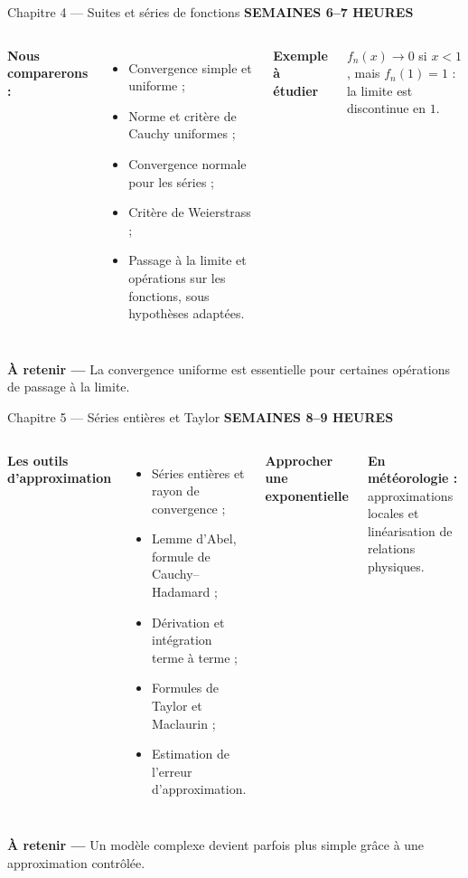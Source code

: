 \documentclass[aspectratio=169,10pt]{beamer}
\newcommand{\meta}[1]{{\small\bfseries\color{turquoise} #1}\par\vspace{0.07cm}}
\newcommand{\formule}[2]{\begin{tcolorbox}[colback=pale,colframe=pale]
  {\small\bfseries\color{bleu}#1}\par\vspace{0.13cm}
  \centering {\large\color{nuit}$\displaystyle #2$}\par
\end{tcolorbox}}
\newcommand{\takeaway}[1]{\vfill\begin{tcolorbox}[colback=palevert,colframe=palevert]
{\small\color{encre}\textbf{À retenir —} #1}\end{tcolorbox}}
\newcommand{\smalllist}{\setlength{\itemsep}{0.04cm}\setlength{\parskip}{0pt}}
\begin{document}
\begin{frame}{Chapitre 4 — Suites et séries de fonctions}
\meta{SEMAINES 6–7 \quad\textbullet{} HEURES}
\begin{columns}[T,onlytextwidth]
{\bfseries\color{nuit}Nous comparerons :}
\begin{itemize}\smalllist
\item Convergence simple et uniforme ;
\item Norme et critère de Cauchy uniformes ;
\item Convergence normale pour les séries ;
\item Critère de Weierstrass ;
\item Passage à la limite et opérations sur les fonctions, sous hypothèses adaptées.
\end{itemize}
\formule{Exemple à étudier}{f_n(x)=x^n,\quad x\in[0,1]}
\begin{tcolorbox}[colback=paleorange,colframe=paleorange]
\small $f_n(x)\to 0$ si $x<1$, mais $f_n(1)=1$ : la limite est discontinue en $1$.
\end{tcolorbox}
\end{columns}
\takeaway{La convergence uniforme est essentielle pour certaines opérations de passage à la limite.}
\end{frame}

\begin{frame}{Chapitre 5 — Séries entières et Taylor}
\meta{SEMAINES 8–9 \quad\textbullet{} HEURES}
\begin{columns}[T,onlytextwidth]
{\bfseries\color{nuit}Les outils d'approximation}
\begin{itemize}\smalllist
\item Séries entières et rayon de convergence ;
\item Lemme d'Abel, formule de Cauchy–Hadamard ;
\item Dérivation et intégration terme à terme ;
\item Formules de Taylor et Maclaurin ;
\item Estimation de l'erreur d'approximation.
\end{itemize}
\formule{Approcher une exponentielle}{e^x=1+x+\frac{x^2}{2!}+\cdots}
\begin{tcolorbox}[colback=palevert,colframe=palevert]
\small \textbf{En météorologie :} approximations locales et linéarisation de relations physiques.
\end{tcolorbox}
\end{columns}
\takeaway{Un modèle complexe devient parfois plus simple grâce à une approximation contrôlée.}
\end{frame}
\end{document}
